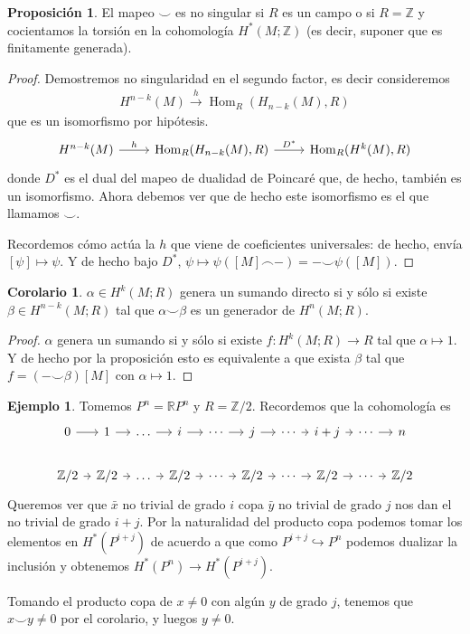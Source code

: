 \documentclass[spanish]{book}
\theoremstyle{definition}
\newtheorem*{prop}{Proposición}
\newtheorem*{coro}{Corolario}
\newtheorem*{ejem}{Ejemplo}
\newcommand{\R}{\mathbb{R}}
\newcommand{\Z}{\mathbb{Z}}
\DeclareMathOperator{\Hom}{Hom}
\begin{document}
\begin{prop}
	El mapeo $\smile$ es no singular si $R$ es un campo o si $R=\Z$ y cocientamos la torsión en la cohomología $H^*(M;\Z)$ (es decir, suponer que es finitamente generada).
\end{prop}
\begin{proof}
	Demostremos no singularidad en el segundo factor, es decir consideremos
	\begin{align*}
		H^{n-k}(M)\overset{h}{\to}\Hom_R(H_{n-k}(M),R)
	\end{align*}
	que es un isomorfismo por hipótesis.
	\[\begin{tikzcd}
		H^{n-k}(M)\arrow[r,"h"]&\Hom_R(H_{n-k}(M),R)\arrow[r,"D^*"]&\Hom_R(H^k(M),R)
	\end{tikzcd}\]
	donde $D^*$ es el dual del mapeo de dualidad de Poincaré que, de hecho, también es un isomorfismo. Ahora debemos ver que de hecho este isomorfismo es el que llamamos $\smile$.
	
	Recordemos cómo actúa la $h$ que viene de coeficientes universales: de hecho, envía $[\psi]\mapsto\psi$. Y de hecho bajo $D^*$, $\psi\mapsto \psi([M] \frown -) = -\smile \psi([M])$.
\end{proof}

\begin{coro}
	$\alpha\in H^k(M;R)$ genera un sumando directo si y sólo si existe $\beta\in H^{n-k}(M;R)$ tal que $\alpha\smile\beta$ es un generador de $H^n(M;R)$.
\end{coro}
\begin{proof}
	$\alpha$ genera un sumando si y sólo si existe $f: H^k(M;R)\to R$ tal que $\alpha\mapsto1$. Y de hecho por la proposición esto es equivalente a que exista $\beta$ tal que $f=(-\smile\beta)[M]$ con $\alpha\mapsto 1$.
\end{proof}
\begin{ejem}
	Tomemos $P^n=\R P^n$ y $R=\Z/2$. Recordemos que la cohomología es
	\[\begin{tikzcd}[column sep=tiny]
		0\arrow[r]&1\arrow[r]&\ldots\arrow[r]&i\arrow[r]&\cdots\arrow[r]&j\arrow[r]&\cdots\arrow[r]&i+j\arrow[r]&\cdots\arrow[r]&n\\
		\Z/2\arrow[r]&\Z/2\arrow[r]&\ldots\arrow[r]&\Z/2\arrow[r]&\cdots\arrow[r]&\Z/2\arrow[r]&\cdots\arrow[r]&\Z/2\arrow[r]&\cdots\arrow[r]&\Z/2
	\end{tikzcd}\]
	Queremos ver que $\bar{x}$ no trivial de grado $i$ copa $\bar{y}$ no trivial de grado $j$ nos dan el no trivial de grado $i+j$. Por la naturalidad del producto copa podemos tomar los elementos en $H^*(P^{i+j})$ de acuerdo a que como $P^{i+j}\hookrightarrow P^n$ podemos dualizar la inclusión y obtenemos $H^*(P^n)\to H^*(P^{i+j})$.
	
	Tomando el producto copa de $x\neq0$ con algún $y$ de grado $j$, tenemos que $x\smile y\neq0$ por el corolario, y luegos $y\neq0$.
\end{ejem}
\end{document}
